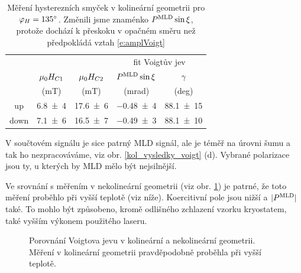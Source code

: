 \begin{table}[htbp]	
	\centering	
	\begin{tabular}{c||cc|cc}
		& & & \multicolumn{2}{c}{fit Voigtův jev} \\
		 & $\mu_0H_{C1}$ & $\mu_0H_{C2}$ & $P^{\text{MLD}} \sin\xi$ & $\gamma$ \\
		 & (mT) & (mT) & (\si{\milli\radian}) & (deg)  \\ \hline
		up & \num{6,8(4)} & \num{17,6(6)} & \num{-0,48(4)} & \num{88,1(15)} \\
		down & \num{7,1(6)} & \num{16,5(7)} & \num{-0,49(3)} & \num{88,1(10)} \\
	\end{tabular}
	\caption{Měření hysterezních smyček v kolineární geometrii pro $\varphi_H=\ang{135}$. Změnili jsme znaménko $P^{\text{MLD}} \sin\xi$, protože dochází k přeskoku v opačném směru než předpokládá vztah \eqref{e:amplVoigt}}
	\label{tab_kol_hyst135}
\end{table}

V součtovém signálu je sice patrný MLD signál, ale je téměř na úrovni šumu a tak ho nezpracováváme, viz obr. \ref{kol_vysledky_voigt} (d). Vybrané polarizace jsou ty, u kterých by MLD mělo být nejsilnější.

Ve srovnání s měřením v nekolineární geometrii (viz obr. \ref{kol_nekol}) je patrné, že toto měření proběhlo při vyšší teplotě (viz níže). Koercitivní pole jsou nižší a $|P^{\text{MLD}}|$ také. To mohlo být způsobeno, kromě odlišného zchlazení vzorku kryostatem, také vyšším výkonem použitého laseru.

\begin{figure}[htbp]\centering
{}
	\caption{Porovnání Voigtova jevu v kolineární a nekolineární geometrii. Měření v kolineární geometrii pravděpodobně proběhla při vyšší teplotě.}\label{kol_nekol}
\end{figure}


